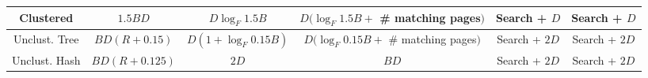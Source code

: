 \documentclass[landscape,8pt]{extarticle}
\begin{document}
\begin{multicols}{4}
\begin{center}
\begin{adjustbox}{angle=270}
\begin{tabular}{ | c | c | c | c | c | c | }
                Clustered     & $1.5 BD$      & $D \log_F 1.5 B$      & $D(\log_F 1.5B + $ \# matching pages$)$  & Search + $D$  & Search + $D$  \\ \hline
                Unclust. Tree & $BD(R+0.15)$  & $D(1 + \log_F 0.15B)$ & $D(\log_F 0.15B + $ \# matching pages$)$ & Search + $2D$ & Search + $2D$ \\ \hline
                Unclust. Hash & $BD(R+0.125)$ & $2D$                  & $BD$                                     & Search + $2D$ & Search + $2D$ \\ \hline
            \end{tabular}
        \end{adjustbox}
    \end{center}
\end{multicols}
\end{document}
